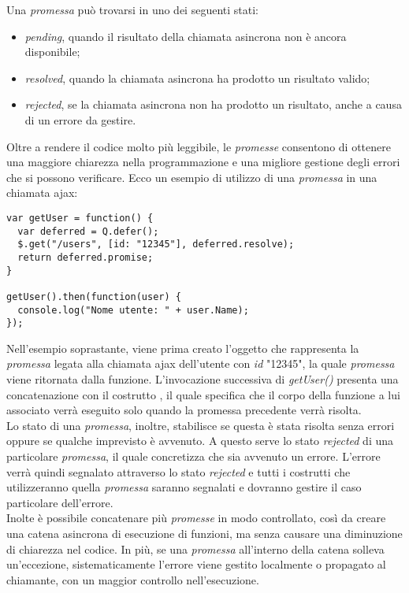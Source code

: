 Una \emph{promessa} può trovarsi in uno dei seguenti stati:
\begin{itemize}
	\item \emph{pending}, quando il risultato della chiamata asincrona non è ancora disponibile;
	\item \emph{resolved}, quando la chiamata asincrona ha prodotto un risultato valido;
	\item \emph{rejected}, se la chiamata asincrona non ha prodotto un risultato, anche a causa di un errore da gestire.
\end{itemize}
Oltre a rendere il codice molto più leggibile, le \emph{promesse} consentono di ottenere una maggiore chiarezza nella programmazione e una migliore gestione degli errori che si possono verificare. Ecco un esempio di utilizzo di una \emph{promessa} in una chiamata \gls{ajax}:
\begin{verbatim}
var getUser = function() {
  var deferred = Q.defer();
  $.get("/users", [id: "12345"], deferred.resolve);
  return deferred.promise;
}
 
getUser().then(function(user) {
  console.log("Nome utente: " + user.Name);
});
\end{verbatim}
Nell'esempio soprastante, viene prima creato l'oggetto che rappresenta la \emph{promessa} legata alla chiamata \gls{ajax} dell'utente con \emph{id} "12345", la quale \emph{promessa} viene ritornata dalla funzione. L'invocazione successiva di \emph{getUser()} presenta una concatenazione con il costrutto , il quale specifica che il corpo della funzione a lui associato verrà eseguito solo quando la promessa precedente verrà risolta.\\
Lo stato di una \emph{promessa}, inoltre, stabilisce se questa è stata risolta senza errori oppure se qualche imprevisto è avvenuto. A questo serve lo stato \emph{rejected} di una particolare \emph{promessa}, il quale concretizza che sia avvenuto un errore. L'errore verrà quindi segnalato attraverso lo stato \emph{rejected} e tutti i costrutti che utilizzeranno quella \emph{promessa} saranno segnalati e dovranno gestire il caso particolare dell'errore.\\
Inolte è possibile concatenare più \emph{promesse} in modo controllato, così da creare una catena asincrona di esecuzione di funzioni, ma senza causare una diminuzione di chiarezza nel codice. In più, se una \emph{promessa} all'interno della catena solleva un'eccezione, sistematicamente l'errore viene gestito localmente o propagato al chiamante, con un maggior controllo nell'esecuzione.

